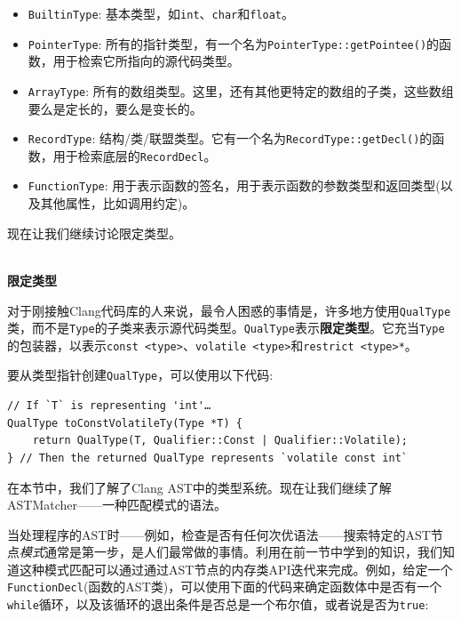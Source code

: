 \begin{itemize}
\item \texttt{BuiltinType}: 基本类型，如\texttt{int}、\texttt{char}和\texttt{float}。

\item \texttt{PointerType}: 所有的指针类型，有一个名为\texttt{PointerType::getPointee()}的函数，用于检索它所指向的源代码类型。

\item \texttt{ArrayType}: 所有的数组类型。这里，还有其他更特定的数组的子类，这些数组要么是定长的，要么是变长的。

\item \texttt{RecordType}: 结构/类/联盟类型。它有一个名为\texttt{RecordType::getDecl()}的函数，用于检索底层的\texttt{RecordDecl}。

\item \texttt{FunctionType}: 用于表示函数的签名，用于表示函数的参数类型和返回类型(以及其他属性，比如调用约定)。

\end{itemize}

现在让我们继续讨论限定类型。

\hspace*{\fill} \\ %
\noindent
\textbf{限定类型}

对于刚接触Clang代码库的人来说，最令人困惑的事情是，许多地方使用\texttt{QualType}类，而不是\texttt{Type}的子类来表示源代码类型。\texttt{QualType}表示\textbf{限定类型}。它充当\texttt{Type}的包装器，以表示\texttt{const <type>}、\texttt{volatile <type>}和\texttt{restrict <type>*}。

要从类型指针创建\texttt{QualType}，可以使用以下代码:

\begin{lstlisting}[style=styleCXX]
// If `T` is representing 'int'…
QualType toConstVolatileTy(Type *T) {
	return QualType(T, Qualifier::Const | Qualifier::Volatile);
} // Then the returned QualType represents `volatile const int`
\end{lstlisting}

在本节中，我们了解了Clang AST中的类型系统。现在让我们继续了解ASTMatcher——一种匹配模式的语法。


当处理程序的AST时——例如，检查是否有任何次优语法——搜索特定的AST节点\textit{模式}通常是第一步，是人们最常做的事情。利用在前一节中学到的知识，我们知道这种模式匹配可以通过通过AST节点的内存类API迭代来完成。例如，给定一个\texttt{FunctionDecl}(函数的AST类)，可以使用下面的代码来确定函数体中是否有一个\texttt{while}循环，以及该循环的退出条件是否总是一个布尔值，或者说是否为\texttt{true}:

